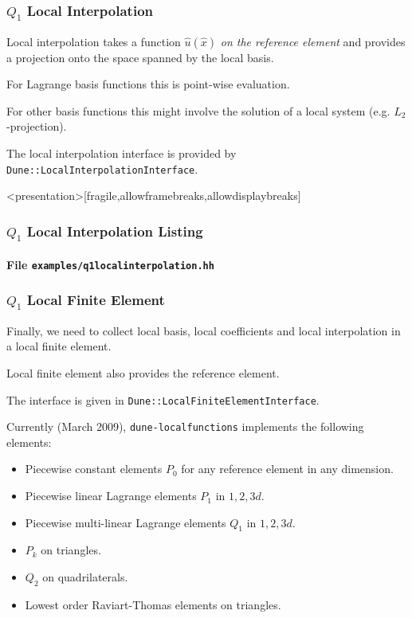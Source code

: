 \begin{frame}
\frametitle<presentation>{$Q_1$ Local Interpolation}
Local interpolation takes a function $\hat{u}(\hat{x})$ \textit{on the
reference element} and provides a projection onto the space spanned by
the local basis.

For Lagrange basis functions this is point-wise evaluation.

For other basis functions this might involve the solution of a local
system (e.g. $L_2$-projection).

The local interpolation interface is provided by
\lstinline{Dune::LocalInterpolationInterface}.
\end{frame}


\begin{frame}<presentation>[fragile,allowframebreaks,allowdisplaybreaks]
\frametitle<presentation>{$Q_1$ Local Interpolation Listing}
\framesubtitle<presentation>{File \texttt{examples/q1localinterpolation.hh}}

\end{frame}

\begin{frame}
\frametitle<presentation>{$Q_1$ Local Finite Element}
Finally, we need to collect local basis, local coefficients and local
interpolation in a local finite element.

Local finite element also provides the reference element.

The interface is given
in \lstinline{Dune::LocalFiniteElementInterface}.

Currently (March 2009), \lstinline{dune-localfunctions} implements the
following elements:
\begin{itemize}
\item Piecewise constant elements $P_0$ for any reference element in any
dimension. 
\item Piecewise linear Lagrange elements $P_1$ in $1, 2, 3d$.
\item Piecewise multi-linear Lagrange elements $Q_1$ in $1, 2, 3d$.
\item $P_k$ on triangles.
\item $Q_2$ on quadrilaterals.
\item Lowest order Raviart-Thomas elements on triangles. 
\end{itemize}
\end{frame}

